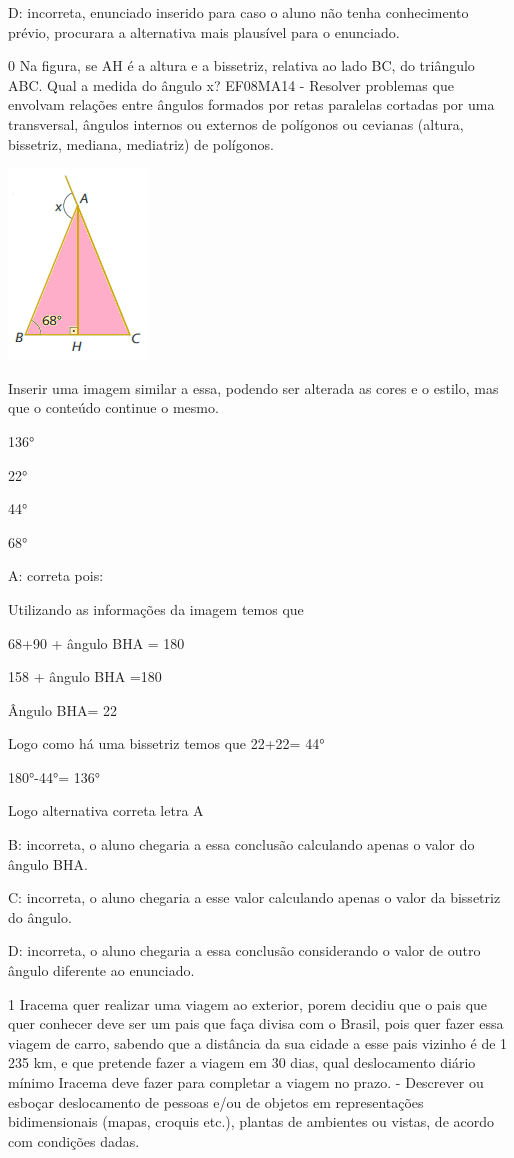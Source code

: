 D: incorreta, enunciado inserido para caso o aluno não tenha
conhecimento prévio, procurara a alternativa mais plausível para o
enunciado.

\num{0} Na figura, se AH é a altura e a bissetriz, relativa ao lado BC, do
triângulo ABC. Qual a medida do ângulo x? EF08MA14 - Resolver problemas
que envolvam relações entre ângulos formados por retas paralelas
cortadas por uma transversal, ângulos internos ou externos de polígonos
ou cevianas (altura, bissetriz, mediana, mediatriz) de polígonos.

\includegraphics[width=1\times 45833in,height=2in]{./imgSAEB_8_MAT/media/image58.png}

Inserir uma imagem similar a essa, podendo ser alterada as cores e o
estilo, mas que o conteúdo continue o mesmo.

\item 136°
\item 22°
\item 44°
\item 68°

A: correta pois:

Utilizando as informações da imagem temos que

68+90 + ângulo BHA = 180

158 + ângulo BHA =180

Ângulo BHA= 22

Logo como há uma bissetriz temos que 22+22= 44°

180°-44°= 136°

Logo alternativa correta letra A

B: incorreta, o aluno chegaria a essa conclusão calculando apenas o
valor do ângulo BHA.

C: incorreta, o aluno chegaria a esse valor calculando apenas o valor da
bissetriz do ângulo.

D: incorreta, o aluno chegaria a essa conclusão considerando o valor de
outro ângulo diferente ao enunciado.

\num{1} Iracema quer realizar uma viagem ao exterior, porem decidiu que o
pais que quer conhecer deve ser um pais que faça divisa com o Brasil,
pois quer fazer essa viagem de carro, sabendo que a distância da sua
cidade a esse pais vizinho é de 1 235 km, e que pretende fazer a viagem
em 30 dias, qual deslocamento diário mínimo Iracema deve fazer para
completar a viagem no prazo. - Descrever ou esboçar deslocamento de
pessoas e/ou de objetos em representações bidimensionais (mapas, croquis
etc.), plantas de ambientes ou vistas, de acordo com condições dadas.

